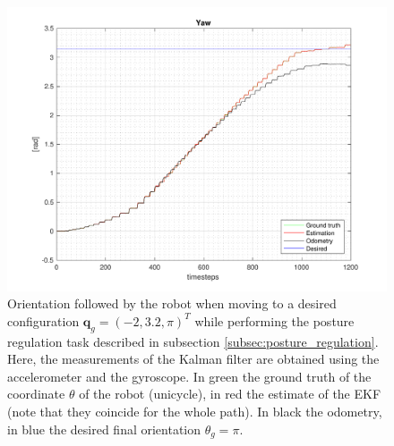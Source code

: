 \documentclass[a4paper]{article}
\begin{document}
\begin{figure}
    \centering
    \includegraphics[width=\textwidth]{images/yaw_postureregulation}
    \caption{Orientation followed by the robot when moving to a desired configuration
        $\bm{q}_g = (-2, 3.2, \pi)^T$ while performing the posture regulation task
        described in subsection \ref{subsec:posture_regulation}.
        Here, the measurements of the Kalman filter are obtained
        using the accelerometer and the gyroscope. In green the ground truth of the coordinate $\theta$ of the
        robot (unicycle), in red the estimate of the EKF (note that they coincide
        for the whole path). In black the odometry, in blue the desired final orientation $\theta_g = \pi$.}
    \label{fig:walk_to_desired_position_yaw}
\end{figure}
\end{document}
